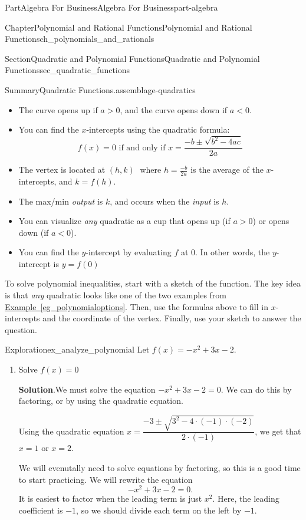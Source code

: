 \documentclass{tufte-book}
\newcommand{\blocktitlefont}{\relax}
\newcommand{\xreffont}{\relax}
\numberwithin{equation}{chapter}
\newcommand{\lt}{<}
\newcommand{\gt}{>}
\begin{document}
\begin{partptx}{Part}{Algebra For Business}{}{Algebra For Business}{}{}{part-algebra}
\begin{chapterptx}{Chapter}{Polynomial and Rational Functions}{}{Polynomial and Rational Functions}{}{}{ch_polynomials_and_rationals}
\begin{sectionptx}{Section}{Quadratic and Polynomial Functions}{}{Quadratic and Polynomial Functions}{}{}{sec_quadratic_functions}
\begin{assemblage}{Summary}{Quadratic Functions.}{assemblage-quadratics}
\begin{itemize}[label=\textbullet]
\item{}The curve opens up if \(a>0\), and the curve opens down if \(a<0\).%
\item{}You can find the \(x\)-intercepts using the quadratic formula:%
\begin{equation*}
f(x) = 0\text{ if and only if }x = \dfrac{-b\pm \sqrt{b^2-4ac}}{2a}
\end{equation*}
%
\item{}The vertex is located at \((h,k)\)\(\phantom{.}\) where \(h=\frac{-b}{2a}\) is the average of the \(x\)-intercepts, and \(k = f(h)\).%
\item{}The max\slash{}min \emph{output} is \(k\), and occurs when the \emph{input} is \(h\).%
\item{}You can visualize \emph{any} quadratic as a cup that opens up (if \(a \gt 0\)) or opens down (if \(a \lt 0\)).%
\item{}You can find the \(y\)-intercept by evaluating \(f\) at \(0\).  In other words, the \(y\)-intercept is \(y=f(0)\)%
\end{itemize}
%
\end{assemblage}
To solve polynomial inequalities, start with a sketch of the function. The key idea is that \emph{any} quadratic looks like one of the two examples from \hyperref[eg_polynomialoptions]{Example~{\xreffont\ref{eg_polynomialoptions}}}.  Then, use the formulas above to fill in \(x\)-intercepts and the coordinate of the vertex.  Finally, use your sketch to answer the question.%
\begin{exploration}{Exploration}{}{ex_analyze_polynomial}%
Let \(f(x)=-x^2 + 3x -2 \).%
\begin{enumerate}[font=\bfseries,label=(\alph*),ref=\alph*]%
\item{}Solve \(f(x) =0\)%
\par\smallskip%
\noindent\textbf{\blocktitlefont Solution}.\hypertarget{ex_analyze_polynomial-2-2}{}\quad{}We must solve the equation \(-x^2 + 3x -2 = 0\). We can do this by factoring, or by using the quadratic equation.%
\par
Using the quadratic equation \(x = \dfrac{-3 \pm \sqrt{3^2 - 4\cdot (-1) \cdot (-2)}}{2\cdot(-1)}\), we get that \(x=1\) or \(x=2\).%
\par
We will evenutally need to solve equations by factoring, so this is a good time to start practicing.  We will rewrite the equation%
\begin{equation*}
-x^2 + 3x -2 = 0 \text{.}
\end{equation*}
It is easiest to factor when the leading term is just  \(x^2\).  Here, the leading coefficient is \(-1\), so we should divide each term on the left by \(-1\).%

\end{enumerate}
\end{exploration}
\end{sectionptx}
\end{chapterptx}
\end{partptx}
\end{document}
